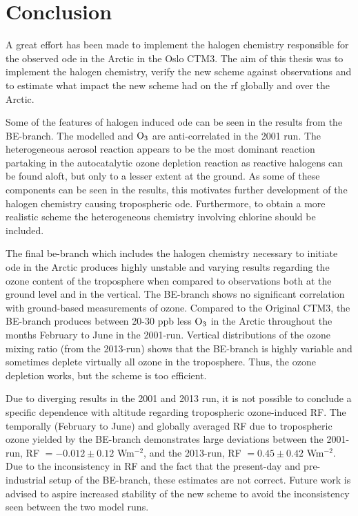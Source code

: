 \setcounter{chapter}{7}
\chapter{Conclusion}\label{Chap:conclusion}

A great effort has been made to implement the halogen chemistry responsible for the observed \acrfull{ode} in the Arctic in the Oslo CTM3. The aim of this thesis was to implement the halogen chemistry, verify the new scheme against observations and to estimate what impact the new scheme had on the \acrfull{rf} globally and over the Arctic.

\medskip

Some of the features of halogen induced \acrshort{ode} can be seen in the results from the BE-branch. The modelled  and $\mathrm{O_3}$ are anti-correlated in the 2001 run. The heterogeneous aerosol reaction appears to be the most dominant reaction partaking in the autocatalytic ozone depletion reaction as reactive halogens can be found aloft, but only to a lesser extent at the ground. As some of these components can be seen in the results, this motivates further development of the halogen chemistry causing tropospheric \acrshort{ode}. Furthermore, to obtain a more realistic scheme the heterogeneous chemistry involving chlorine should be included. 

\medskip

The final \acrfull{be}-branch which includes the halogen chemistry necessary to initiate \acrshort{ode} in the Arctic produces highly unstable and varying results regarding the ozone content of the troposphere when compared to observations both at the ground level and in the vertical. The BE-branch shows no significant correlation with ground-based measurements of ozone. Compared to the Original CTM3, the BE-branch produces between 20-30 ppb less $\mathrm{O_3}$ in the Arctic throughout the months February to June in the 2001-run. Vertical distributions of the ozone mixing ratio (from the 2013-run) shows that the BE-branch is highly variable and sometimes deplete virtually all ozone in the troposphere. Thus, the ozone depletion works, but the scheme is too efficient. 


\medskip

Due to diverging results in the 2001 and 2013 run, it is not possible to conclude a specific dependence with altitude regarding tropospheric ozone-induced RF. The temporally (February to June) and globally averaged RF due to tropospheric ozone yielded by the BE-branch demonstrates large deviations between the 2001-run, RF $=-0.012\pm0.12$ Wm$^{-2}$, and the 2013-run, RF $= 0.45\pm0.42$ Wm$^{-2}$. Due to the inconsistency in RF and the fact that the present-day and pre-industrial setup of the BE-branch, these estimates are not correct. Future work is advised to aspire increased stability of the new scheme to avoid the inconsistency seen between the two model runs.  